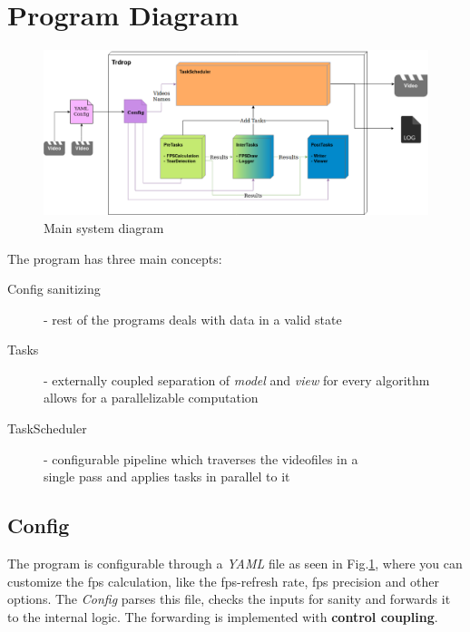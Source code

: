 \documentclass[titlepage]{article}
\begin{document}
\section{Program Diagram}

\begin{figure}[H]
\hspace{-20mm}
\includegraphics[width=430pt,left]{../../images/trdrop-main-system.eps}
\caption{Main system diagram}
\label{fig:main-system}
\end{figure}

The program has three main concepts:

\begin{description}
    \item [Config sanitizing] - rest of the programs deals with data in a valid state
    \item [Tasks] - externally coupled separation of \textit{model} and \textit{view} for every algorithm allows for a parallelizable computation
    \item [TaskScheduler] - configurable pipeline which traverses the videofiles in a \\single pass and applies tasks in parallel to it
\end{description}

\subsection{Config}
The program is configurable through a \textit{YAML} file as seen in Fig.\ref{fig:main-system}, where you can customize the fps calculation, like the fps-refresh rate, fps precision and other options. The \textit{Config} parses this file, checks the inputs for sanity and forwards it to the internal logic. The forwarding is implemented with \textbf{control coupling}. \\
\end{document}
